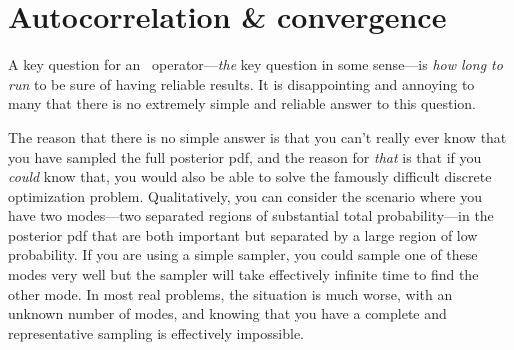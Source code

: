 \documentclass[modern]{aastex61}
\newcommand{\MCMC}{\acronym{MCMC}}
\begin{document}
\section{Autocorrelation \& convergence}\label{sec:convergence}%
\nopagebreak%
A key question for an \MCMC\ operator---\emph{the} key question in some
sense---is \emph{how long to run} to be sure of having reliable
results.
It is disappointing and annoying to many that there is no extremely
simple and reliable answer to this question.

The reason that there is no simple answer is that you can't really
ever know that you have sampled the full posterior pdf, and the reason
for \emph{that} is that if you \emph{could} know that, you would also
be able to solve the famously difficult discrete optimization
problem.
Qualitatively, you can consider the scenario where you have two modes---two
separated regions of substantial total probability---in the posterior pdf that
are both important but separated by a large region of low probability.
If you are using a simple sampler, you could sample one of these modes
very well but the sampler will take effectively infinite time to find
the other mode.
In most real problems, the situation is much worse, with an unknown number of
modes, and knowing that you have a complete and representative sampling
is effectively impossible.
\end{document}
